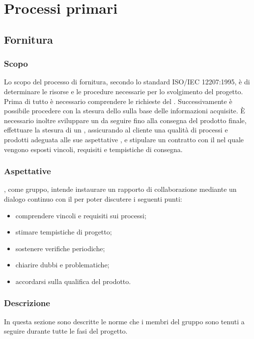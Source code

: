 \section{Processi primari}
\subsection{Fornitura}
\subsubsection{Scopo}
Lo scopo del processo di fornitura, secondo lo standard ISO/IEC 12207:1995, è di determinare le risorse e le procedure necessarie per lo svolgimento del progetto.\\
Prima di tutto è necessario comprendere le richieste del \proponProg{}. Successivamente è possibile procedere con la stesura dello \SdFv{} sulla base delle informazioni acquisite.
È necessario inoltre sviluppare un \PdPv{} da seguire fino alla consegna del prodotto finale, effettuare la stesura di un \PdQv{}, assicurando al cliente una qualità di processi e prodotti adeguata alle sue aspettative , e stipulare un contratto con il \proponProg{} nel quale vengono esposti vincoli, requisiti e tempistiche di consegna.

\subsubsection{Aspettative}
\Omicron, come gruppo, intende instaurare un rapporto di collaborazione mediante un dialogo continuo con il \proponProg{} per poter discutere i seguenti punti:
\begin{itemize}
    \item{comprendere vincoli e requisiti sui processi;}
    \item{stimare tempistiche di progetto;}
    \item{sostenere verifiche periodiche;}
    \item{chiarire dubbi e problematiche;}
    \item{accordarsi sulla qualifica del prodotto.}
\end{itemize}

\subsubsection{Descrizione}
In questa sezione sono descritte le norme che i membri del gruppo \Omicron{} sono tenuti a seguire durante tutte le fasi del progetto.

